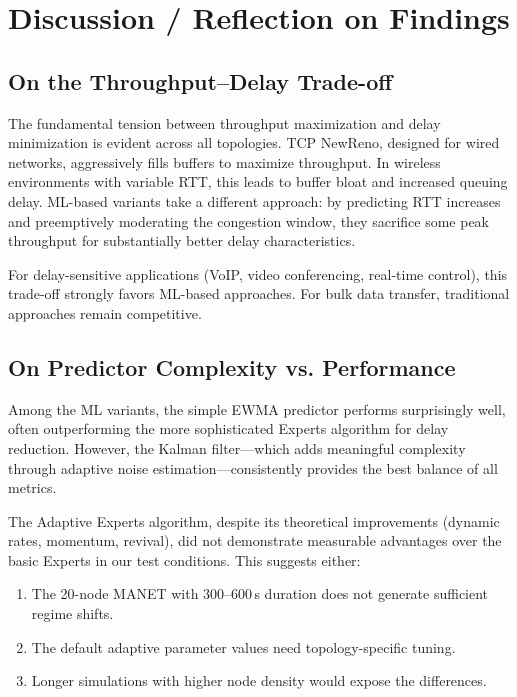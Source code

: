 \documentclass[12pt,a4paper]{article}
\begin{document}
\section{Discussion / Reflection on Findings}
\label{sec:discussion}

\subsection{On the Throughput--Delay Trade-off}
The fundamental tension between throughput maximization and delay minimization is evident across all topologies.
TCP NewReno, designed for wired networks, aggressively fills buffers to maximize throughput.
In wireless environments with variable RTT, this leads to buffer bloat and increased queuing delay.
ML-based variants take a different approach: by predicting RTT increases and preemptively moderating the congestion window, they sacrifice some peak throughput for substantially better delay characteristics.

For delay-sensitive applications (VoIP, video conferencing, real-time control), this trade-off strongly favors ML-based approaches. For bulk data transfer, traditional approaches remain competitive.

\subsection{On Predictor Complexity vs. Performance}
Among the ML variants, the simple EWMA predictor performs surprisingly well, often outperforming the more sophisticated Experts algorithm for delay reduction. However, the Kalman filter---which adds meaningful complexity through adaptive noise estimation---consistently provides the best balance of all metrics.

The Adaptive Experts algorithm, despite its theoretical improvements (dynamic rates, momentum, revival), did not demonstrate measurable advantages over the basic Experts in our test conditions.
This suggests either:
\begin{enumerate}[nosep,label=(\alph*)]
    \item The 20-node MANET with 300--600\,s duration does not generate sufficient regime shifts.
    \item The default adaptive parameter values need topology-specific tuning.
    \item Longer simulations with higher node density would expose the differences.
\end{enumerate}
\end{document}
